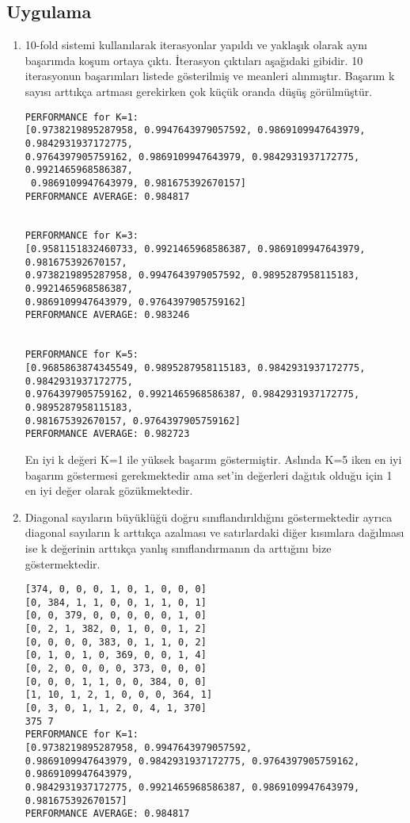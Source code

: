 \documentclass[11pt]{article}
\begin{document}
\subsection*{Uygulama}
\begin{enumerate}[\indent a)]
\item
10-fold sistemi kullanılarak iterasyonlar yapıldı ve yaklaşık olarak aynı başarımda koşum ortaya çıktı. İterasyon çıktıları aşağıdaki gibidir. 10 iterasyonun başarımları listede gösterilmiş ve meanleri alınmıştır. Başarım k sayısı arttıkça artması gerekirken çok küçük oranda düşüş görülmüştür.

\begin{verbatim}
PERFORMANCE for K=1: 
[0.9738219895287958, 0.9947643979057592, 0.9869109947643979, 0.9842931937172775,
0.9764397905759162, 0.9869109947643979, 0.9842931937172775, 0.9921465968586387,
 0.9869109947643979, 0.981675392670157]
PERFORMANCE AVERAGE: 0.984817


PERFORMANCE for K=3: 
[0.9581151832460733, 0.9921465968586387, 0.9869109947643979, 0.981675392670157, 
0.9738219895287958, 0.9947643979057592, 0.9895287958115183, 0.9921465968586387, 
0.9869109947643979, 0.9764397905759162]
PERFORMANCE AVERAGE: 0.983246


PERFORMANCE for K=5: 
[0.9685863874345549, 0.9895287958115183, 0.9842931937172775, 0.9842931937172775, 
0.9764397905759162, 0.9921465968586387, 0.9842931937172775, 0.9895287958115183, 
0.981675392670157, 0.9764397905759162]
PERFORMANCE AVERAGE: 0.982723
\end{verbatim}

En iyi k değeri K=1 ile yüksek başarım göstermiştir. Aslında K=5 iken en iyi başarım göstermesi gerekmektedir ama set'in değerleri dağıtık olduğu için 1 en iyi değer olarak gözükmektedir.

\item
Diagonal sayıların büyüklüğü doğru sınıflandırıldığını göstermektedir ayrıca diagonal sayıların k arttıkça azalması ve satırlardaki diğer kısımlara dağılması ise k değerinin arttıkça yanlış sınıflandırmanın da arttığını bize göstermektedir.

\begin{verbatim}
[374, 0, 0, 0, 1, 0, 1, 0, 0, 0]
[0, 384, 1, 1, 0, 0, 1, 1, 0, 1]
[0, 0, 379, 0, 0, 0, 0, 0, 1, 0]
[0, 2, 1, 382, 0, 1, 0, 0, 1, 2]
[0, 0, 0, 0, 383, 0, 1, 1, 0, 2]
[0, 1, 0, 1, 0, 369, 0, 0, 1, 4]
[0, 2, 0, 0, 0, 0, 373, 0, 0, 0]
[0, 0, 0, 1, 1, 0, 0, 384, 0, 0]
[1, 10, 1, 2, 1, 0, 0, 0, 364, 1]
[0, 3, 0, 1, 1, 2, 0, 4, 1, 370]
375 7
PERFORMANCE for K=1: 
[0.9738219895287958, 0.9947643979057592,
0.9869109947643979, 0.9842931937172775, 0.9764397905759162, 0.9869109947643979,
0.9842931937172775, 0.9921465968586387, 0.9869109947643979, 0.981675392670157]
PERFORMANCE AVERAGE: 0.984817


\end{verbatim}
\end{enumerate}
\end{document}
